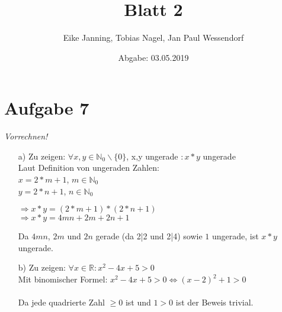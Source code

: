 \documentclass[paper = a4, ngerman]{scrartcl}
\title{Blatt 2}
\author{Eike Janning, Tobias Nagel, Jan Paul Wessendorf}
\date{Abgabe: 03.05.2019}
\begin{document}
	\maketitle
	\hrulefill
	
	\section*{Aufgabe 7}
	\textit{Vorrechnen!}
		\begin{itemize}
			\item[a)] Zu zeigen: $\forall x,y \in \mathbb{N}_0 \backslash \{ 0 \}$, x,y ungerade $: x*y$ ungerade\\
			Laut Definition von ungeraden Zahlen:\\
			$x = 2*m+1$, $m\in \mathbb{N}_0$\\
			$y = 2*n+1$, $n\in \mathbb{N}_0$
			\begin{center}
				$\Rightarrow x*y = (2*m+1)*(2*n+1)$\\
				$\Rightarrow x*y = 4mn + 2m + 2n + 1$
			\end{center}
			Da $4mn$, $2m$ und $2n$ gerade (da 2|2 und 2|4) sowie $1$ ungerade, ist $x*y$ ungerade.
			
			\item[b)] Zu zeigen: $\forall x \in \mathbb{R} : x^2 - 4x + 5 > 0$\\
			Mit binomischer Formel: $x^2 - 4x + 5 > 0 \Leftrightarrow (x - 2)^2 + 1 > 0$\\\\
			Da jede quadrierte Zahl $\ge 0$ ist und $1 > 0$ ist der Beweis trivial.
\pagebreak
			

\end{itemize}
\end{document}
